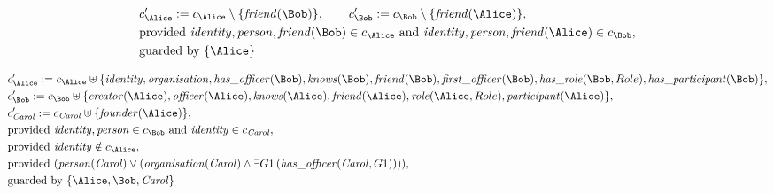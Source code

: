 \begin{align*}
&
c'_
{
\Alice
}
 := 
c_
{
\Alice
}
 \setminus 
\{
\mathit{\detokenize{
friend
}}
(
\Bob
)
\}
, \qquad 
c'_
{
\Bob
}
 := 
c_
{
\Bob
}
 \setminus 
\{
\mathit{\detokenize{
friend
}}
(
\Alice
)
\}
,\\
&
\text{provided } 
\mathit{\detokenize{
identity
}}
,
\mathit{\detokenize{
person
}}
,
\mathit{\detokenize{
friend
}}
(
\Bob
)
 \in c_
{
\Alice
}
 \text{ and } 
\mathit{\detokenize{
identity
}}
,
\mathit{\detokenize{
person
}}
,
\mathit{\detokenize{
friend
}}
(
\Alice
)
 \in c_
{
\Bob
}
,\\
&
\text{guarded by } \{
\Alice
\}
\end{align*}

\begin{align*}
&
c'_
{
\Alice
}
 := 
c_
{
\Alice
}
 \uplus 
\{
\mathit{\detokenize{
identity
}}
,
\mathit{\detokenize{
organisation
}}
,
\mathit{\detokenize{
has_officer
}}
(
\Bob
)
,
\mathit{\detokenize{
knows
}}
(
\Bob
)
,
\mathit{\detokenize{
friend
}}
(
\Bob
)
,
\mathit{\detokenize{
first_officer
}}
(
\Bob
)
,
\mathit{\detokenize{
has_role
}}
(
\Bob
,
Role
)
,
\mathit{\detokenize{
has_participant
}}
(
\Bob
)
\}
,\\
&
c'_
{
\Bob
}
 := 
c_
{
\Bob
}
 \uplus 
\{
\mathit{\detokenize{
creator
}}
(
\Alice
)
,
\mathit{\detokenize{
officer
}}
(
\Alice
)
,
\mathit{\detokenize{
knows
}}
(
\Alice
)
,
\mathit{\detokenize{
friend
}}
(
\Alice
)
,
\mathit{\detokenize{
role
}}
(
\Alice
,
Role
)
,
\mathit{\detokenize{
participant
}}
(
\Alice
)
\}
,\\
&
c'_
{
\mathit{Carol}
}
 := 
c_
{
\mathit{Carol}
}
 \uplus 
\{
\mathit{\detokenize{
founder
}}
(
\Alice
)
\}
,\\
&
\text{provided } 
\mathit{\detokenize{
identity
}}
,
\mathit{\detokenize{
person
}}
 \in c_
{
\Bob
}
 \text{ and } 
\mathit{\detokenize{
identity
}}
 \in c_
{
\mathit{Carol}
}
,\\
&
\text{provided } 
\mathit{\detokenize{
identity
}}
 \notin c_
{
\Alice
}
,\\
&
\text{provided } 
(
\mathit{\detokenize{
person
}}
(
\mathit{Carol}
)
\lor
(
\mathit{\detokenize{
organisation
}}
(
\mathit{Carol}
)
\land
\exists 
G1
\,(
\mathit{\detokenize{
has_officer
}}
(
\mathit{Carol}
,
G1
)
)
)
)
,\\
&
\text{guarded by } \{
\Alice
,
\Bob
,
\mathit{Carol}
\}
\end{align*}

